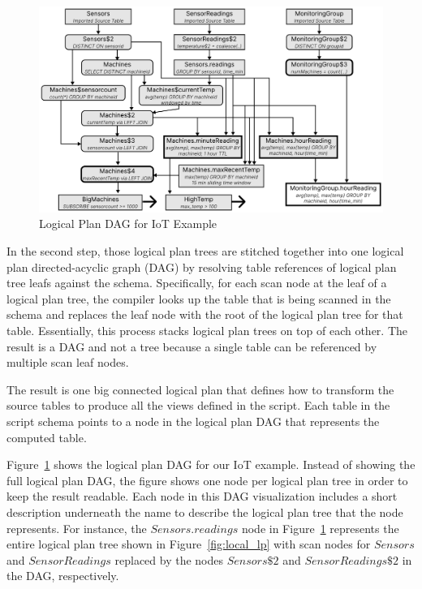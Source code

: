 \documentclass[	DIV=calc,%
							paper=letter,%
							fontsize=11pt,%
							twocolumn]{scrartcl}	 					%
\begin{document}
\begin{figure}[t]
\centering
\includegraphics[width=1.0\textwidth]{logical_dag.pdf}
\caption{Logical Plan DAG for IoT Example}
\label{fig:lp_dag}
\end{figure}

In the second step, those logical plan trees are stitched together into one logical plan directed-acyclic graph (DAG) by resolving table references of logical plan tree leafs against the schema. Specifically, for each scan node at the leaf of a logical plan tree, the compiler looks up the table that is being scanned in the schema and replaces the leaf node with the root of the logical plan tree for that table. Essentially, this process stacks logical plan trees on top of each other. The result is a DAG and not a tree because a single table can be referenced by multiple scan leaf nodes.

The result is one big connected logical plan that defines how to transform the source tables to produce all the views defined in the script. Each table in the script schema points to a node in the logical plan DAG that represents the computed table.

Figure~\ref{fig:lp_dag} shows the logical plan DAG for our IoT example. Instead of showing the full logical plan DAG, the figure shows one node per logical plan tree in order to keep the result readable. Each node in this DAG visualization includes a short description underneath the name to describe the logical plan tree that the node represents. For instance, the $Sensors.readings$ node in Figure~\ref{fig:lp_dag} represents the entire logical plan tree shown in Figure~\ref{fig:local_lp} with scan nodes for $Sensors$ and $SensorReadings$ replaced by the nodes $Sensors\$2$ and $SensorReadings\$2$ in the DAG, respectively.
\end{document}
